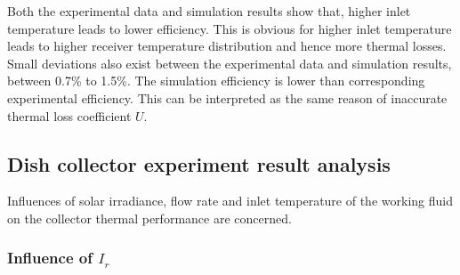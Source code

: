 Both the experimental data and simulation results show that, higher inlet temperature leads to lower efficiency. This is obvious for higher inlet temperature leads to higher receiver temperature distribution and hence more thermal losses. Small deviations also exist between the experimental data and simulation results, between 0.7\% to 1.5\%. The simulation efficiency is lower than corresponding experimental efficiency. This can be interpreted as the same reason of inaccurate thermal loss coefficient $U$.

\subsection{Dish collector experiment result analysis}
Influences of solar irradiance, flow rate and inlet temperature of the working fluid on the collector thermal performance are concerned.
\subsubsection{Influence of $I_r$}

